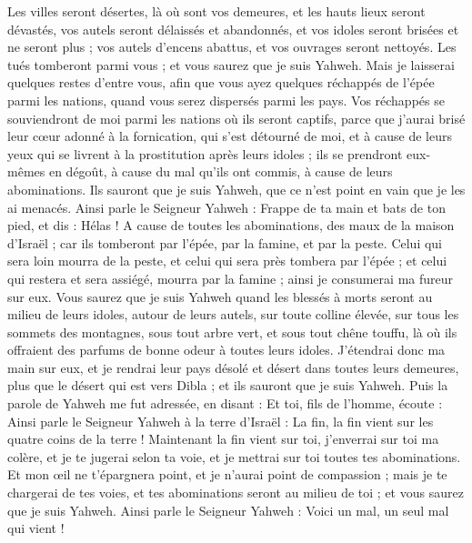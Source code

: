 \begin{multicols}{2}
Les villes seront désertes, là où sont vos demeures, et les hauts lieux seront dévastés, vos autels seront délaissés et abandonnés, et vos idoles seront brisées et ne seront plus ; vos autels d’encens abattus, et vos ouvrages seront nettoyés.
Les tués tomberont parmi vous ; et vous saurez que je suis Yahweh.
Mais je laisserai quelques restes d’entre vous, afin que vous ayez quelques réchappés de l'épée parmi les nations, quand vous serez dispersés parmi les pays.
Vos réchappés se souviendront de moi parmi les nations où ils seront captifs, parce que j’aurai brisé leur cœur adonné à la fornication, qui s’est détourné de moi, et à cause de leurs yeux qui se livrent à la prostitution après leurs idoles ; ils se prendront eux-mêmes en dégoût, à cause du mal qu’ils ont commis, à cause de leurs abominations.
Ils sauront que je suis Yahweh, que ce n’est point en vain que je les ai menacés.
Ainsi parle le Seigneur Yahweh : Frappe de ta main et bats de ton pied, et dis : Hélas ! A cause de toutes les abominations, des maux de la maison d'Israël ; car ils tomberont par l'épée, par la famine, et par la peste.
Celui qui sera loin mourra de la peste, et celui qui sera près tombera par l'épée ; et celui qui restera et sera assiégé, mourra par la famine ; ainsi je consumerai ma fureur sur eux.
Vous saurez que je suis Yahweh quand les blessés à morts seront au milieu de leurs idoles, autour de leurs autels, sur toute colline élevée, sur tous les sommets des montagnes, sous tout arbre vert, et sous tout chêne touffu, là où ils offraient des parfums de bonne odeur à toutes leurs idoles.
J'étendrai donc ma main sur eux, et je rendrai leur pays désolé et désert dans toutes leurs demeures, plus que le désert qui est vers Dibla ; et ils sauront que je suis Yahweh.
\VerseOne{}Puis la parole de Yahweh me fut adressée, en disant :
Et toi, fils de l’homme, écoute : Ainsi parle le Seigneur Yahweh à la terre d'Israël : La fin, la fin vient sur les quatre coins de la terre !
Maintenant la fin vient sur toi, j'enverrai sur toi ma colère, et je te jugerai selon ta voie, et je mettrai sur toi toutes tes abominations.
Et mon œil ne t'épargnera point, et je n'aurai point de compassion ; mais je te chargerai de tes voies, et tes abominations seront au milieu de toi ; et vous saurez que je suis Yahweh.
Ainsi parle le Seigneur Yahweh : Voici un mal, un seul mal qui vient !

\end{multicols}
